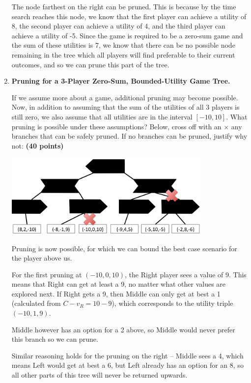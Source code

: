 \begin{enumerate}
{\color{red}
The node farthest on the right can be pruned.
This is because by the time search reaches this node, we know that the first player can achieve a utility of 8, the second player can achieve a utility of 4, and the third player can achieve a utility of -5.
Since the game is required to be a zero-sum game and the sum of these utilities is 7, we know that there can be no possible node remaining in the tree which all players will find preferable to their current outcomes, and so we can prune this part of the tree.
}


\item {\bf Pruning for a 3-Player Zero-Sum, Bounded-Utility Game Tree.}

If we assume more about a game, additional pruning may become possible.  Now, in addition to assuming that the sum of the utilities of
all 3 players is still zero, we also assume that all utilities are in the interval $[-10, 10]$.
What pruning is possible under these assumptions?  Below, cross off with an $\times$ any branches that can be safely pruned.   If no branches can be pruned, justify why not: {\bf (40 points)}

\begin{center}
    \includegraphics[width=4in]{figures/skeleton_solution}
\end{center}

{\color{red}
Pruning is now possible, for which we can bound the best case scenario for the player above us.

For the first pruning at $(-10,0,10)$, the Right player sees a value of 9. This means that Right can get at least a 9, no matter what other values are explored next. If Right gets a 9, then Middle can only get at best a 1 (calculated from $C - v_R = 10 - 9$), which corresponds to the utility triple $(-10,1,9)$.

Middle however has an option for a 2 above, so Middle would never prefer this branch so we can prune.

Similar reasoning holds for the pruning on the right -- Middle sees a 4, which means Left would get at best a 6, but Left already has an option for an 8, so all other parts of this tree will never be returned upwards.
    }

\end{enumerate}